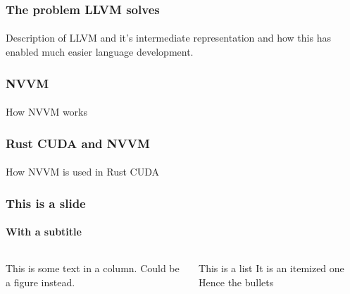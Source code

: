 \documentclass[aspectratio=169]{beamer}
\begin{document}
\begin{frame}
	\frametitle{The problem LLVM solves}
    \framesubtitle{}

    Description of LLVM and it's intermediate representation and how this has enabled much easier language development.
\end{frame}

\begin{frame}
	\frametitle{NVVM}
    \framesubtitle{}

    How NVVM works
\end{frame}

\begin{frame}
	\frametitle{Rust CUDA and NVVM}
    \framesubtitle{}

    How NVVM is used in Rust CUDA
\end{frame}

\begin{frame}
	\frametitle{This is a slide}
    \framesubtitle{With a subtitle}

	\begin{columns}
		\begin{column}{0.6\textwidth}
            This is some text in a column. Could be a figure instead.
		\end{column}
		\begin{column}{0.4\textwidth}
			\begin{outline}[itemize]
				\1
                This is a list
				\1
                It is an itemized one
				\1
                Hence the bullets
			\end{outline}
		\end{column}
	\end{columns}
\end{frame}

%     
% 
% 
\end{document}
